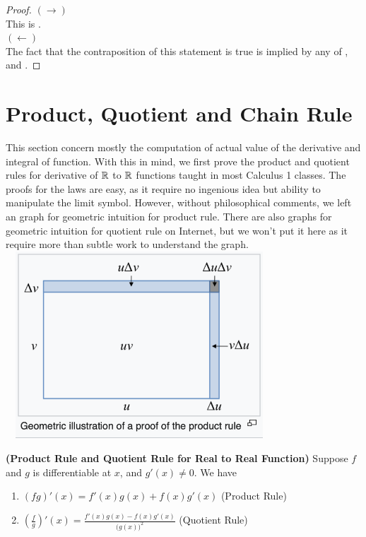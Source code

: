 \documentclass{report}
\begin{document}
\begin{proof}
$(\longrightarrow)$\\

This is .\\

$(\longleftarrow)$\\

The fact that the contraposition of this  statement is true is implied by any of ,  and . 
\end{proof}
\section{Product, Quotient and Chain Rule}
\begin{mdframed}
This section concern mostly the computation of actual value of the derivative and integral of function. With this in mind, we first prove the product and quotient rules for derivative of $\mathbb{R}$ to  $\mathbb{R}$ functions taught in most Calculus 1 classes. The proofs for the laws are easy, as it require no ingenious idea but ability to manipulate the limit symbol. However, without philosophical comments, we left an graph for geometric intuition for product rule. There are also graphs for geometric intuition for quotient rule on Internet, but we won't put it here as it require more than subtle work to understand the graph.    
\includegraphics[height=7cm,width=10cm]{product rule.png}
\end{mdframed}
\label{11}
\begin{theorem}
\textbf{(Product Rule and Quotient Rule for Real to Real Function)} Suppose $f$ and $g$ is differentiable at  $x$, and $g'(x)\neq 0$. We have 
\label{3}
\begin{enumerate}[label=(\alph*)]
  \item $(fg)'(x)=f'(x)g(x)+f(x)g'(x)$ (Product Rule)
  \item $(\frac{f}{g})'(x)=\frac{f'(x)g(x)-f(x)g'(x)}{\big(g(x) \big)^2}$ (Quotient Rule)
\end{enumerate}
\end{theorem}
\end{document}
